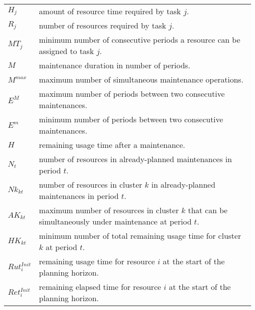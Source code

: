 \documentclass[a4paper,onecolumn,fleqn]{article}
\begin{document}
    \begin{tabular}{p{8mm}p{167mm}}
        $H_j$             & amount of resource time required by task $j$. \\
        $R_j$             & number of resources required by task $j$. \\
        $MT_j$            & minimum number of consecutive periods a resource can be assigned to task $j$. \\
        $M$               & maintenance duration in number of periods. \\
        $M^{max}$         & maximum number of simultaneous maintenance operations. \\
        $E^{M}$         & maximum number of periods between two consecutive maintenances. \\
        $E^{m}$         & minimum number of periods between two consecutive maintenances. \\
        $H$               & remaining usage time after a maintenance. \\
        $N_t$             & number of resources in already-planned maintenances in period $t$.\\
        $Nk_{kt}$         & number of resources in cluster $k$ in already-planned maintenances in period $t$.\\
        $AK_{kt}$         & maximum number of resources in cluster $k$ that can be simultaneously under maintenance at period $t$.\\
        $HK_{kt}$         & minimum number of total remaining usage time for cluster $k$ at period $t$.\\
        $Rut^{Init}_{i}$  & remaining usage time for resource $i$ at the start of the planning horizon. \\
        $Ret^{Init}_{i}$  & remaining elapsed time for resource $i$ at the start of the planning horizon. \\
    \end{tabular}
\end{document}
